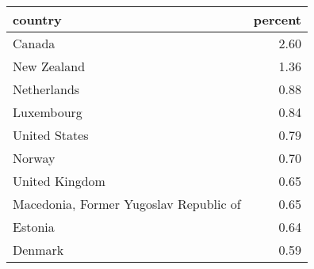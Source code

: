 \begin{table}[ht]
\centering
\begin{tabular}{lr}
  \hline
country & percent \\ 
  \hline
Canada & 2.60 \\ 
  New Zealand & 1.36 \\ 
  Netherlands & 0.88 \\ 
  Luxembourg & 0.84 \\ 
  United States & 0.79 \\ 
  Norway & 0.70 \\ 
  United Kingdom & 0.65 \\ 
  Macedonia, Former Yugoslav Republic of & 0.65 \\ 
  Estonia & 0.64 \\ 
  Denmark & 0.59 \\ 
   \hline
\end{tabular}
\end{table}
